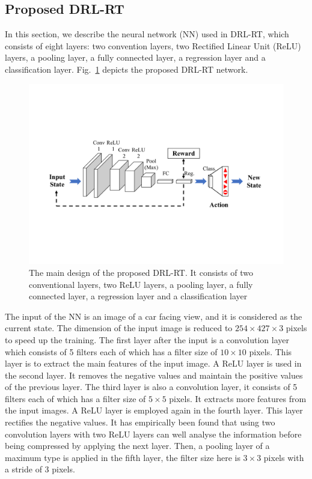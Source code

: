\documentclass{svproc}
\begin{document}
	\subsection{Proposed DRL-RT} 
	In this section, we describe the neural network (NN) used in DRL-RT, which consists of eight layers: two convention layers, two Rectified Linear Unit (ReLU) layers, a pooling layer, a fully connected layer, a regression layer and a classification layer. Fig.~\ref{Fig:Deep_Reinf_Net} depicts the proposed DRL-RT network.
	\begin{figure}[!h]
		\centering
		\includegraphics[scale=.4,trim=2cm 5.5cm 2cm 5.5cm,clip]{Deep_Reinf_Net1.pdf}
		\caption{The main design of the proposed DRL-RT. It consists of two conventional layers, two ReLU layers, a pooling layer, a fully connected layer, a regression layer and a classification layer}
		\label{Fig:Deep_Reinf_Net}
	\end{figure}
	The input of the NN is an image of a car facing view, and it is considered as the current state. The dimension of the input image %
	is reduced to $254 \times 427 \times 3$ pixels to speed up the training. The first layer after the input is a convolution layer which consists of 5 filters each of which has a filter size of $10 \times 10$ pixels. This layer is to extract the main features of the input image. A ReLU layer is used in the second layer. It removes the negative values and maintain the positive values of the previous layer. The third layer is also a convolution layer, it consists of 5 filters each of which has a filter size of $5 \times 5$ pixels. It extracts more features from the input images. A ReLU layer is employed again in the fourth layer. This layer rectifies the negative values. It has empirically been found that using two convolution layers with two ReLU layers can well analyse the information before being compressed by applying the next layer. Then, a pooling layer of a maximum type is applied in the fifth layer, the filter size here is $3 \times 3$ pixels with a stride of 3 pixels. 
\end{document}
